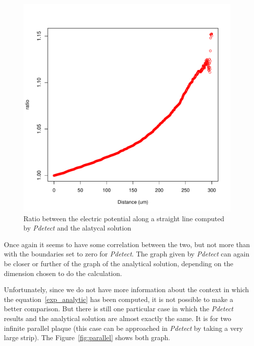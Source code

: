 \documentclass[11pt]{article}
\begin{document}
\begin{figure}[H]
\begin{minipage}[b]{.46\linewidth}
					\includegraphics[scale=0.45]{images/boundary_conditions/semi-free_ratio.pdf}
					\caption{Ratio between the electric potential along a straight line 
							computed by \textit{Pdetect} and the alatycal solution}
					\label{fig:semi_free_ratio}
				\end{minipage}
			\end{figure}

			Once again it seems to have some correlation between the two, but not more than with the boundaries
			set to zero for \textit{Pdetect}. The graph given by \textit{Pdetect} can again be closer or further
			of the graph of the analytical solution, depending on the dimension chosen to do the calculation.

			Unfortunately, since we do not have more information about the context in which the equation~\ref{exp_analytic}
			has been computed, it is not possible to make a better comparison. But there is still one particular
			case in which the \textit{Pdetect} results and the analytical solution are almost exactly the same.
			It is for two infinite parallel plaque (this case can be approached in \textit{Pdetect} by taking
			a very large strip). The Figure~\ref{fig:parallel} shows both graph.
\end{document}
